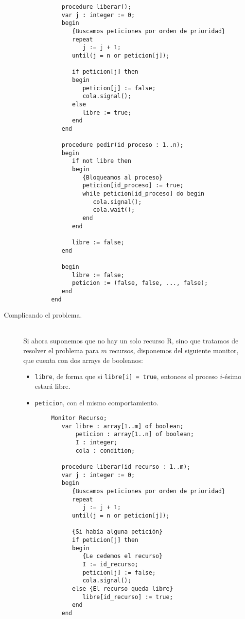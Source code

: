 \begin{ejercicio}
\begin{description}
\begin{verbatim}
           procedure liberar();
           var j : integer := 0;
           begin
              {Buscamos peticiones por orden de prioridad}
              repeat
                 j := j + 1;
              until(j = n or peticion[j]);

              if peticion[j] then
              begin
                 peticion[j] := false;
                 cola.signal();
              else
                 libre := true;
              end
           end

           procedure pedir(id_proceso : 1..n);
           begin
              if not libre then
              begin
                 {Bloqueamos al proceso}
                 peticion[id_proceso] := true;
                 while peticion[id_proceso] do begin
                    cola.signal();
                    cola.wait();
                 end
              end

              libre := false;
           end

           begin
              libre := false;
              peticion := (false, false, ..., false);
           end
        end
    \end{verbatim}
        \item [Complicando el problema.]~\\
    Si ahora suponemos que no hay un solo recurso R, sino que tratamos de resolver el problema para $m$ recursos, disponemos del siguiente monitor, que cuenta con dos arrays de booleanos:
    \begin{itemize}
        \item \verb|libre|, de forma que si \verb|libre[i] = true|, entonces el proceso $i$-ésimo estará libre.
        \item \verb|peticion|, con el mismo comportamiento.
    \end{itemize}

    \begin{verbatim}
        Monitor Recurso;
           var libre : array[1..m] of boolean;
               peticion : array[1..n] of boolean;
               I : integer;
               cola : condition;

           procedure liberar(id_recurso : 1..m);
           var j : integer := 0;
           begin
              {Buscamos peticiones por orden de prioridad}
              repeat
                 j := j + 1;
              until(j = n or peticion[j]);

              {Si había alguna petición}
              if peticion[j] then
              begin
                 {Le cedemos el recurso}
                 I := id_recurso;
                 peticion[j] := false;
                 cola.signal();
              else {El recurso queda libre}
                 libre[id_recurso] := true;
              end
           end


\end{verbatim}
\end{description}
\end{ejercicio}
